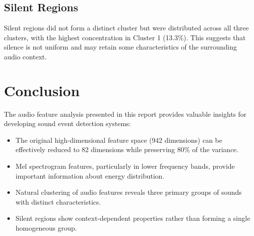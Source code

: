 \documentclass[11pt,a4paper]{article}
\begin{document}
\subsection{Silent Regions}

Silent regions did not form a distinct cluster but were distributed across all three clusters, with the highest concentration in Cluster 1 (13.3\%). This suggests that silence is not uniform and may retain some characteristics of the surrounding audio context.

\section{Conclusion}

The audio feature analysis presented in this report provides valuable insights for developing sound event detection systems:

\begin{itemize}
    \item The original high-dimensional feature space (942 dimensions) can be effectively reduced to 82 dimensions while preserving 80\% of the variance.
    \item Mel spectrogram features, particularly in lower frequency bands, provide important information about energy distribution.
    \item Natural clustering of audio features reveals three primary groups of sounds with distinct characteristics.
    \item Silent regions show context-dependent properties rather than forming a single homogeneous group.
\end{itemize}
\end{document}
